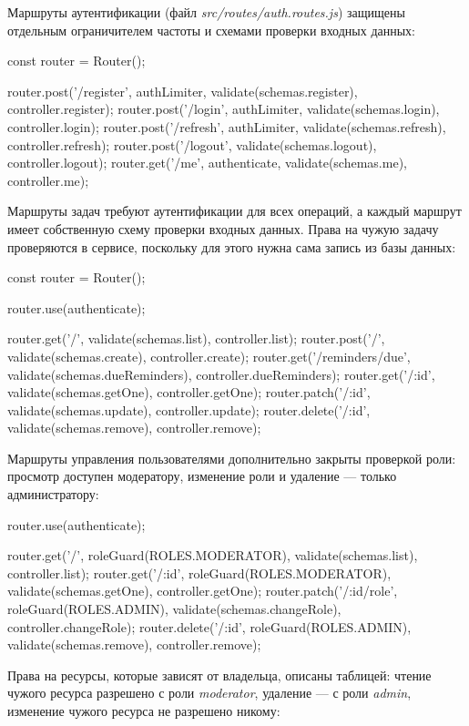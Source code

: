 \documentclass{stp}
\begin{document}
Маршруты аутентификации (файл \textit{src/routes/auth.routes.js}) защищены
отдельным ограничителем частоты и схемами проверки входных данных:

\begin{stplisting}
const router = Router();

router.post('/register', authLimiter,
  validate(schemas.register), controller.register);
router.post('/login', authLimiter,
  validate(schemas.login), controller.login);
router.post('/refresh', authLimiter,
  validate(schemas.refresh), controller.refresh);
router.post('/logout', validate(schemas.logout),
  controller.logout);
router.get('/me', authenticate, validate(schemas.me),
  controller.me);
\end{stplisting}

Маршруты задач требуют аутентификации для всех операций, а каждый
маршрут имеет собственную схему проверки входных данных. Права на чужую
задачу проверяются в сервисе, поскольку для этого нужна сама запись из
базы данных:

\begin{stplisting}
const router = Router();

router.use(authenticate);

router.get('/', validate(schemas.list), controller.list);
router.post('/', validate(schemas.create),
  controller.create);
router.get('/reminders/due',
  validate(schemas.dueReminders), controller.dueReminders);
router.get('/:id', validate(schemas.getOne),
  controller.getOne);
router.patch('/:id', validate(schemas.update),
  controller.update);
router.delete('/:id', validate(schemas.remove),
  controller.remove);
\end{stplisting}

Маршруты управления пользователями дополнительно закрыты проверкой
роли: просмотр доступен модератору, изменение роли и удаление — только
администратору:

\begin{stplisting}
router.use(authenticate);

router.get('/', roleGuard(ROLES.MODERATOR),
  validate(schemas.list), controller.list);
router.get('/:id', roleGuard(ROLES.MODERATOR),
  validate(schemas.getOne), controller.getOne);
router.patch('/:id/role', roleGuard(ROLES.ADMIN),
  validate(schemas.changeRole), controller.changeRole);
router.delete('/:id', roleGuard(ROLES.ADMIN),
  validate(schemas.remove), controller.remove);
\end{stplisting}

Права на ресурсы, которые зависят от владельца, описаны таблицей:
чтение чужого ресурса разрешено с роли \textit{moderator}, удаление — с роли
\textit{admin}, изменение чужого ресурса не разрешено никому:
\end{document}
